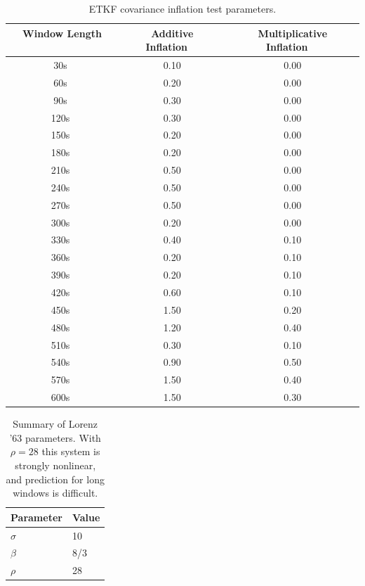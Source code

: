\documentclass[12pt]{report}
\begin{document}
\begin{table}[h!]
\caption[ETKF covariance inflation test parameters]{ETKF covariance inflation test parameters.}
\begin{center}
\begin{tabular}{ccc}
\hline
{\bf Window Length ~~~~} & {\bf Additive Inflation~~} & {\bf Multiplicative Inflation~~}\\
\hline
\hline
~30s ~& 0.10 & 0.00 \\ \hline
~60s ~& 0.20 & 0.00 \\ \hline
~90s ~& 0.30 & 0.00 \\ \hline
~120s ~& 0.30 & 0.00 \\ \hline
~150s ~& 0.20 & 0.00 \\ \hline
~180s ~& 0.20 & 0.00 \\ \hline
~210s ~& 0.50 & 0.00 \\ \hline
~240s ~& 0.50 & 0.00 \\ \hline
~270s ~& 0.50 & 0.00 \\ \hline
~300s ~& 0.20 & 0.00 \\ \hline
~330s ~& 0.40 & 0.10 \\ \hline
~360s ~& 0.20 & 0.10 \\ \hline
~390s ~& 0.20 & 0.10 \\ \hline
~420s ~& 0.60 & 0.10 \\ \hline
~450s ~& 1.50 & 0.20 \\ \hline
~480s ~& 1.20 & 0.40 \\ \hline
~510s ~& 0.30 & 0.10 \\ \hline
~540s ~& 0.90 & 0.50 \\ \hline
~570s ~& 1.50 & 0.40 \\ \hline
~600s ~& 1.50 & 0.30 \\
\hline
\end{tabular}
\end{center}
\label{table:ETKFCovInfl}
\end{table} 

\begin{table}[h]
\caption[Summary of Lorenz '63 parameters]
  {
    Summary of Lorenz '63 parameters.
    With $\rho=28$ this system is strongly nonlinear, and prediction for long windows is difficult.
  }
\label{table:lorenz63params}
\begin{center}
\begin{tabular}{ll} 
\hline
Parameter & Value \\ 
\hline
\hline
$\sigma$ & 10 \\
\hline
$\beta$ & 8/3 \\
\hline
$\rho$ & 28 \\
\hline
\end{tabular}
\end{center}
\end{table}
\end{document}

